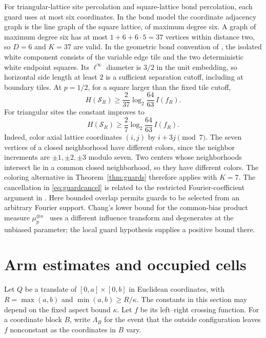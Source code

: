\documentclass[11pt]{amsart}
\theoremstyle{remark}
\newcommand{\cS}{\mathcal S}
\begin{document}
For triangular-lattice site percolation and square-lattice bond percolation, each guard uses at most six coordinates. In the bond model the coordinate adjacency graph is the line graph of the square lattice, of maximum degree six. A graph of maximum degree six has at most $1+6+6\cdot5=37$ vertices within distance two, so $D=6$ and $K=37$ are valid. In the geometric bond convention of \cite{GPS}, the isolated white component consists of the variable edge tile and the two deterministic white endpoint squares. Its $\ell^\infty$ diameter is $3/2$ in the unit embedding, so horizontal side length at least $2$ is a sufficient separation cutoff, including at boundary tiles. At $p=1/2$, for a square larger than the fixed tile cutoff,
\[
 H(\cS_R)\ge\frac{2}{37}\log_2\frac{64}{63}\,I(f_R).
\]
For triangular sites the constant improves to
\begin{equation}\label{eq:triangular_guard_constant}
 H(\cS_R)\ge\frac{2}{7}\log_2\frac{64}{63}\,I(f_R).
\end{equation}
Indeed, color axial lattice coordinates $(i,j)$ by $i+3j\pmod7$. The seven vertices of a closed neighborhood have different colors, since the neighbor increments are $\pm1,\pm2,\pm3$ modulo seven. Two centers whose neighborhoods intersect lie in a common closed neighborhood, so they have different colors. The coloring alternative in Theorem~\ref{thm:guards} therefore applies with $K=7$. The cancellation in \eqref{eq:guardcancel} is related to the restricted Fourier-coefficient argument in \cite[Lemma~4.3]{GPS}. Here bounded overlap permits guards to be selected from an arbitrary Fourier support. Chang's lower bound for the common-bias product measure $\mu_p^{\otimes n}$~\cite{Chang} uses a different influence transform and degenerates at the unbiased parameter; the local guard hypothesis supplies a positive bound there.

\section{Arm estimates and occupied cells}\label{sec:upper}

Let $Q$ be a translate of $[0,a]\times[0,b]$ in Euclidean coordinates, with $R=\max(a,b)$ and $\min(a,b)\ge R/\kappa$. The constants in this section may depend on the fixed aspect bound $\kappa$. Let $f$ be its left--right crossing function. For a coordinate block $B$, write $\Lambda_B$ for the event that the outside configuration leaves $f$ nonconstant as the coordinates in $B$ vary.
\end{document}
